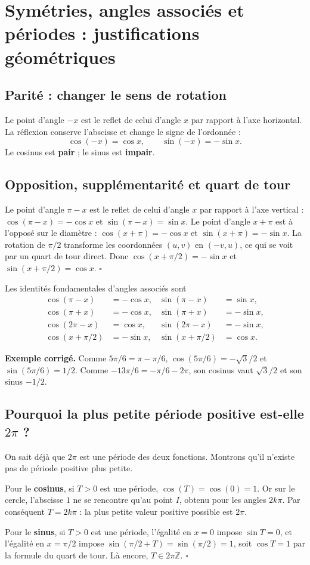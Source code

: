 \documentclass[../cours_spe_trigo.tex]{subfiles}
\begin{document}
\setcounter{chapter}{5}
\chapter{Symétries, angles associés et périodes : justifications géométriques}
\section{Parité : changer le sens de rotation}
Le point d'angle $-x$ est le reflet de celui d'angle $x$ par rapport à l'axe horizontal. La réflexion conserve l'abscisse et change le signe de l'ordonnée :
\[\boxed{\cos(-x)=\cos x,\qquad\sin(-x)=-\sin x.}\]
Le cosinus est \textbf{pair} ; le sinus est \textbf{impair}.

\section{Opposition, supplémentarité et quart de tour}
\begin{demonstration}
Le point d'angle $\pi-x$ est le reflet de celui d'angle $x$ par rapport à l'axe vertical :
$\cos(\pi-x)=-\cos x$ et $\sin(\pi-x)=\sin x$.
Le point d'angle $x+\pi$ est à l'opposé sur le diamètre :
$\cos(x+\pi)=-\cos x$ et $\sin(x+\pi)=-\sin x$.
La rotation de $\pi/2$ transforme les coordonnées $(u,v)$ en $(-v,u)$, ce qui se voit par un quart de tour direct. Donc
$\cos(x+\pi/2)=-\sin x$ et $\sin(x+\pi/2)=\cos x$. $\square$
\end{demonstration}
\begin{propriete}
Les identités fondamentales d'angles associés sont
\[
\begin{array}{rlrl}
\cos(\pi-x)&=-\cos x,&\sin(\pi-x)&=\sin x,\\
\cos(\pi+x)&=-\cos x,&\sin(\pi+x)&=-\sin x,\\
\cos(2\pi-x)&=\cos x,&\sin(2\pi-x)&=-\sin x,\\
\cos(x+\pi/2)&=-\sin x,&\sin(x+\pi/2)&=\cos x.
\end{array}
\]
\end{propriete}
\textbf{Exemple corrigé.} Comme $5\pi/6=\pi-\pi/6$, $\cos(5\pi/6)=-\sqrt3/2$ et $\sin(5\pi/6)=1/2$. Comme $-13\pi/6=-\pi/6-2\pi$, son cosinus vaut $\sqrt3/2$ et son sinus $-1/2$.

\section{Pourquoi la plus petite période positive est-elle $2\pi$ ?}
\begin{demonstration}
On sait déjà que $2\pi$ est une période des deux fonctions. Montrons qu'il n'existe pas de période positive plus petite.

Pour le \textbf{cosinus}, si $T>0$ est une période, $\cos(T)=\cos(0)=1$. Or sur le cercle, l'abscisse $1$ ne se rencontre qu'au point $I$, obtenu pour les angles $2k\pi$. Par conséquent $T=2k\pi$ : la plus petite valeur positive possible est $2\pi$.

Pour le \textbf{sinus}, si $T>0$ est une période, l'égalité en $x=0$ impose $\sin T=0$, et l'égalité en $x=\pi/2$ impose
$\sin(\pi/2+T)=\sin(\pi/2)=1$, soit $\cos T=1$ par la formule du quart de tour. Là encore, $T\in2\pi\mathbb Z$. $\square$
\end{demonstration}
\end{document}
